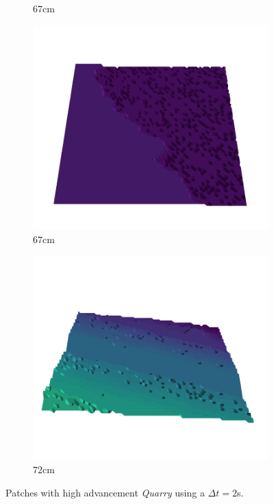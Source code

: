 \documentclass[../document.tex]{subfiles}
\begin{document}
\begin{figure}[H]
\begin{subfigure}[b]{0.19\textwidth}
    \caption{$67$cm}
    \end{subfigure}
    \begin{subfigure}[b]{0.19\textwidth}
    \includegraphics[width=\linewidth]{../img/5/quarry/all/best/67-patch-3d-majavi-colormap-8.png}
    \caption{$67$cm}
    \end{subfigure}
    \begin{subfigure}[b]{0.19\textwidth}
    \includegraphics[width=\linewidth]{../img/5/quarry/all/best/72-patch-3d-majavi-colormap-9.png}
    \caption{$72$cm}
    \end{subfigure}
    \caption{Patches with high advancement \emph{Quarry} using a $\Delta t = 2$s.}
\end{figure}
\end{document}
